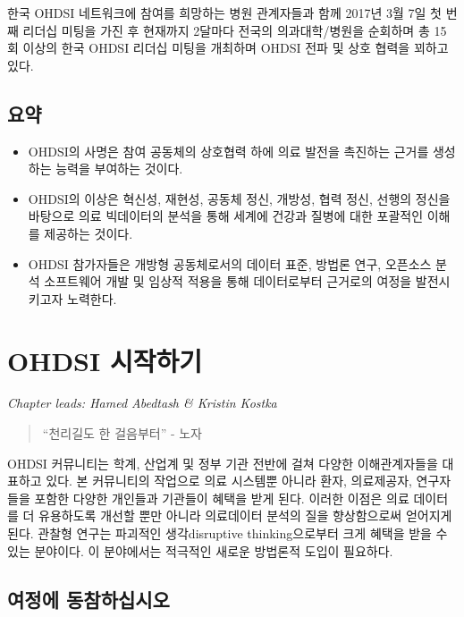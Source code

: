 \documentclass[11pt]{book}
\theoremstyle{definition}
\theoremstyle{definition}
\theoremstyle{definition}
\theoremstyle{remark}
\let\BeginKnitrBlock\begin \let\EndKnitrBlock\end
\begin{document}
한국 OHDSI 네트워크에 참여를 희망하는 병원 관계자들과 함께 2017년 3월
7일 첫 번째 리더십 미팅을 가진 후 현재까지 2달마다 전국의
의과대학/병원을 순회하며 총 15회 이상의 한국 OHDSI 리더십 미팅을
개최하며 OHDSI 전파 및 상호 협력을 꾀하고 있다.

\section{요약}

\BeginKnitrBlock{rmdsummary}
\begin{itemize}
\item
  OHDSI의 사명은 참여 공동체의 상호협력 하에 의료 발전을 촉진하는 근거를
  생성하는 능력을 부여하는 것이다.
\item
  OHDSI의 이상은 혁신성, 재현성, 공동체 정신, 개방성, 협력 정신, 선행의
  정신을 바탕으로 의료 빅데이터의 분석을 통해 세계에 건강과 질병에 대한
  포괄적인 이해를 제공하는 것이다.
\item
  OHDSI 참가자들은 개방형 공동체로서의 데이터 표준, 방법론 연구,
  오픈소스 분석 소프트웨어 개발 및 임상적 적용을 통해 데이터로부터
  근거로의 여정을 발전시키고자 노력한다.
\end{itemize}
\EndKnitrBlock{rmdsummary}

\chapter{OHDSI 시작하기}\label{WhereToBegin}

\emph{Chapter leads: Hamed Abedtash \& Kristin Kostka}

\begin{quote}
``천리길도 한 걸음부터'' - 노자
\end{quote}

OHDSI 커뮤니티는 학계, 산업계 및 정부 기관 전반에 걸쳐 다양한
이해관계자들을 대표하고 있다. 본 커뮤니티의 작업으로 의료 시스템뿐
아니라 환자, 의료제공자, 연구자들을 포함한 다양한 개인들과 기관들이
혜택을 받게 된다. 이러한 이점은 의료 데이터를 더 유용하도록 개선할 뿐만
아니라 의료데이터 분석의 질을 향상함으로써 얻어지게 된다. 관찰형 연구는
파괴적인 생각disruptive thinking으로부터 크게 혜택을 받을 수 있는
분야이다. 이 분야에서는 적극적인 새로운 방법론적 도입이 필요하다.

\section{여정에 동참하십시오}\label{-}
\end{document}
